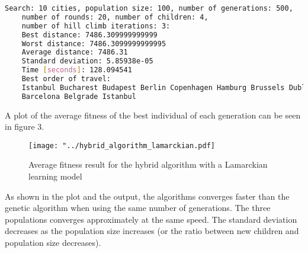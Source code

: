 \documentclass{article}
\begin{document}
\begin{lstlisting}[language=bash]
	Search: 10 cities, population size: 100, number of generations: 500, 
	number of rounds: 20, number of children: 4, 
	number of hill climb iterations: 3: 
	Best distance: 7486.309999999999
	Worst distance: 7486.3099999999995
	Average distance: 7486.31
	Standard deviation: 5.85938e-05
	Time [seconds]: 128.094541
	Best order of travel: 
	Istanbul Bucharest Budapest Berlin Copenhagen Hamburg Brussels Dublin 
	Barcelona Belgrade Istanbul
\end{lstlisting}
\noindent
A plot of the average fitness of the best individual of each generation can be seen in figure 3.
\begin{figure}[H]
\begin{center}
\texttt{[image: "../hybrid\_algorithm\_lamarckian.pdf]}
\caption{Average fitness result for the hybrid algorithm with a Lamarckian learning model}
\end{center}
\end{figure}
\noindent
As shown in the plot and the output, the algorithms converges faster than the genetic algorithm when using the same number of generations. The three populations converges approximately at the same speed. The standard deviation decreases as the population size increases (or the ratio between new children and population size decreases).
\end{document}

